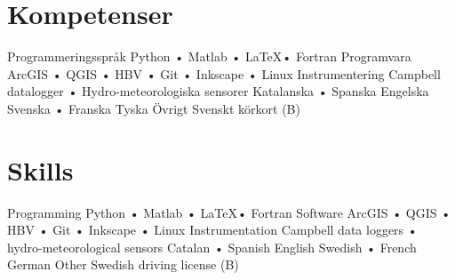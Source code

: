 \ifswedish
    \section{Kompetenser}
        \skill
            {Programmeringsspråk}
            {Python • Matlab • \LaTeX • Fortran}
        \skill
            {Programvara}
            {ArcGIS • QGIS • HBV • Git • Inkscape • Linux}
        \skill
            {Instrumentering}
            {Campbell datalogger • Hydro-meteorologiska sensorer}
        \languages
            {Katalanska • Spanska}
            {Engelska}
            {Svenska • Franska}
            {Tyska}
        \skill
            {Övrigt}
            {Svenskt körkort (B)}
\else
    \section{Skills}
        \skill
            {Programming}
            {Python • Matlab • \LaTeX • Fortran}
        \skill
            {Software}
            {ArcGIS • QGIS • HBV • Git • Inkscape • Linux}
        \skill
            {Instrumentation}
            {Campbell data loggers • hydro-meteorological sensors}
        \languages
            {Catalan • Spanish}
            {English}
            {Swedish • French}
            {German}
        \skill
            {Other}
            {Swedish driving license (B)}
\fi
